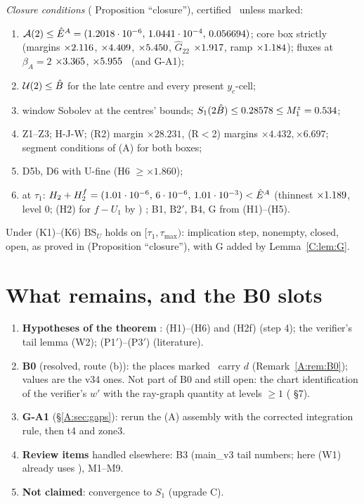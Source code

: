 \documentclass[11pt]{article}
\begin{document}
\noindent\emph{Closure conditions} ( Proposition ``closure''), certified \tC\ unless marked:
\begin{enumerate}[label=(K\arabic*),leftmargin=2.6em]
\item $\mathcal A(2)\le\hat E^A=(1.2018\cdot10^{-6},\,1.0441\cdot10^{-4},\,0.056694)$; core box strictly (margins $\times2.116$, $\times4.409$, $\times5.450$, $\hat G_{22}$ $\times1.917$, ramp $\times1.184$); fluxes at $\beta_A=2$ $\times3.365$, $\times5.955$ \tB\ (and G-A1);
\item $\mathcal U(2)\le\hat B$ for the late centre and every present $y_c$-cell;
\item window Sobolev at the centres' bounds; $S_1(2\hat B)\le0.28578\le M_1^z=0.534$;
\item Z1--Z3; H-J-W; (R2) margin $\times28.231$, (R$<$2) margins $\times4.432,\times6.697$; segment conditions of (A) for both boxes;
\item D5b, D6 with U-fine (H6 $\ge\times1.860$);
\item at $\tau_1$: $H_2+H^f_2=(1.01\cdot10^{-6},\,6\cdot10^{-6},\,1.01\cdot10^{-3})<\hat E^A$ (thinnest $\times1.189$, level 0; (H2) for $f-U_1$ by ) \tB; B1, B2$'$, B4, G from (H1)--(H5).
\end{enumerate}
Under (K1)--(K6) $\mathrm{BS}_U$ holds on $[\tau_1,\tau_{\max})$: implication step, nonempty, closed, open, as proved in  (Proposition ``closure''), with G added by Lemma~\ref{C:lem:G}.



\section{What remains, and the B0 slots}\label{M:sec:remains}
\begin{enumerate}[leftmargin=*]
\item \textbf{Hypotheses of the theorem} \tH: (H1)--(H6) and (H2f) (step 4); the verifier's tail lemma (W2); (P1$'$)--(P3$'$) (literature).
\item \textbf{B0} (resolved, route (b)): the places marked \tB\ carry $d$ (Remark~\ref{A:rem:B0}); values are the v34 ones. Not part of B0 and still open: the chart identification of the verifier's $w'$ with the ray-graph quantity at levels $\ge1$ ( \S7).
\item \textbf{G-A1} (\S\ref{A:sec:gaps}): rerun the (A) assembly with the corrected integration rule, then t4 and zone3.
\item \textbf{Review items} handled elsewhere: B3 (main\_v3 tail numbers; here (W1) already uses ), M1--M9.
\item \textbf{Not claimed}: convergence to $S_1$ (upgrade C).
\end{enumerate}
\end{document}
